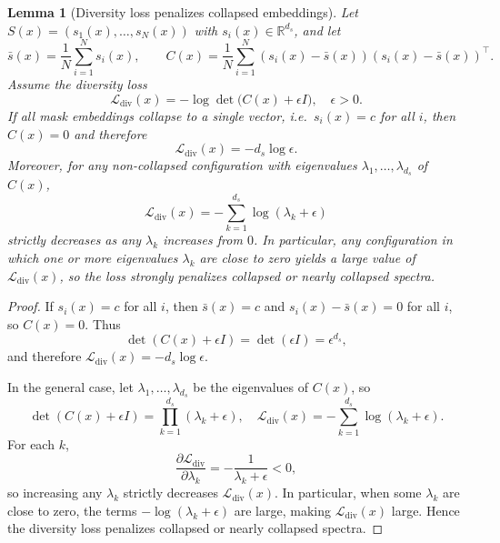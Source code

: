 \documentclass[12pt]{article}
\newtheorem{lemma}{Lemma}
\begin{document}
\begin{lemma}[Diversity loss penalizes collapsed embeddings]
Let \(S(x) = (s_1(x),\dots,s_N(x))\) with \(s_i(x) \in \mathbb{R}^{d_s}\), and let
\[
\bar{s}(x) = \frac{1}{N} \sum_{i=1}^N s_i(x), \qquad
C(x) = \frac{1}{N} \sum_{i=1}^N (s_i(x) - \bar{s}(x))(s_i(x) - \bar{s}(x))^\top.
\]
Assume the diversity loss
\[
\mathcal{L}_{\mathrm{div}}(x)
= - \log \det \big(C(x) + \epsilon I\big), \quad \epsilon > 0.
\]
If all mask embeddings collapse to a single vector, i.e.\ \(s_i(x) = c\) for all \(i\),
then \(C(x) = 0\) and therefore
\[
\mathcal{L}_{\mathrm{div}}(x) = - d_s \log \epsilon.
\]
Moreover, for any non-collapsed configuration with eigenvalues
\(\lambda_1,\dots,\lambda_{d_s}\) of \(C(x)\),
\[
\mathcal{L}_{\mathrm{div}}(x)
= - \sum_{k=1}^{d_s} \log (\lambda_k + \epsilon)
\]
strictly decreases as any \(\lambda_k\) increases from \(0\).
In particular, any configuration in which one or more eigenvalues
\(\lambda_k\) are close to zero yields a large value of
\(\mathcal{L}_{\mathrm{div}}(x)\), so the loss strongly penalizes
collapsed or nearly collapsed spectra.
\end{lemma}

\begin{proof}
If \(s_i(x) = c\) for all \(i\), then \(\bar{s}(x) = c\) and
\(s_i(x) - \bar{s}(x) = 0\) for all \(i\), so \(C(x) = 0\).
Thus
\[
\det(C(x) + \epsilon I) = \det(\epsilon I) = \epsilon^{d_s},
\]
and therefore \(\mathcal{L}_{\mathrm{div}}(x) = - d_s \log \epsilon\).

In the general case, let \(\lambda_1,\dots,\lambda_{d_s}\) be the eigenvalues of
\(C(x)\), so
\[
\det(C(x) + \epsilon I) = \prod_{k=1}^{d_s} (\lambda_k + \epsilon),
\quad
\mathcal{L}_{\mathrm{div}}(x)
= - \sum_{k=1}^{d_s} \log (\lambda_k + \epsilon).
\]
For each \(k\),
\[
\frac{\partial \mathcal{L}_{\mathrm{div}}}{\partial \lambda_k}
= - \frac{1}{\lambda_k + \epsilon} < 0,
\]
so increasing any \(\lambda_k\) strictly decreases
\(\mathcal{L}_{\mathrm{div}}(x)\).
In particular, when some \(\lambda_k\) are close to zero, the terms
\(-\log(\lambda_k + \epsilon)\) are large, making
\(\mathcal{L}_{\mathrm{div}}(x)\) large.
Hence the diversity loss penalizes collapsed or nearly collapsed spectra.
\end{proof}
\end{document}
